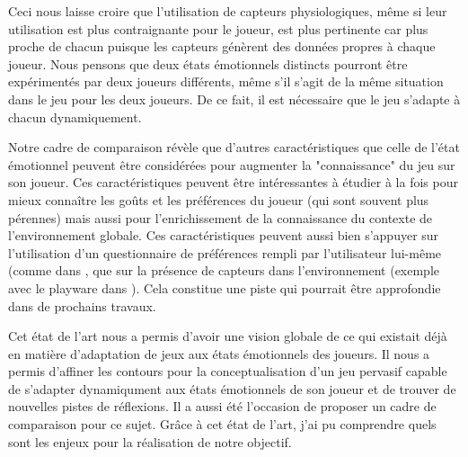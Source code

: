 \documentclass[11pt]{article}
\begin{document}
		Ceci nous laisse croire que l'utilisation de capteurs physiologiques, même si leur utilisation est plus contraignante pour le joueur, est plus pertinente car plus proche de chacun puisque les capteurs génèrent des données propres à chaque joueur.
		Nous pensons que deux états émotionnels distincts pourront être expérimentés par deux joueurs différents, même s'il s'agit de la même situation dans le jeu pour les deux joueurs.
		De ce fait, il est nécessaire que le jeu s'adapte à chacun dynamiquement.\par
		Notre cadre de comparaison révèle que d'autres caractéristiques que celle de l'état émotionnel peuvent être considérées pour augmenter la "connaissance" du jeu sur son joueur.
		Ces caractéristiques peuvent être intéressantes à étudier à la fois pour mieux connaître les goûts et les préférences du joueur (qui sont souvent plus pérennes) mais aussi pour l'enrichissement de la connaissance du contexte de l'environnement globale.
		Ces caractéristiques peuvent aussi bien s'appuyer sur l'utilisation d'un questionnaire de préférences rempli par l'utilisateur lui-même (comme dans \cite{carofiglio_et_al._2019, maier_et_al._2019}, que sur la présence de capteurs dans l'environnement (exemple avec le playware dans \cite{yannakakis_et_al._2013}).
		Cela constitue une piste qui pourrait être approfondie dans de prochains travaux.\par
		Cet état de l'art nous a permis d'avoir une vision globale de ce qui existait déjà en matière d'adaptation de jeux aux états émotionnels des joueurs. 
		Il nous a permis d'affiner les contours pour la conceptualisation d'un jeu pervasif capable de s'adapter dynamiqument aux états émotionnels de son joueur et de trouver de nouvelles pistes de réflexions. 
		Il a aussi été l'occasion de proposer un cadre de comparaison pour ce sujet.
		Grâce à cet état de l'art, j'ai pu comprendre quels sont les enjeux pour la réalisation de notre objectif.
\end{document}
